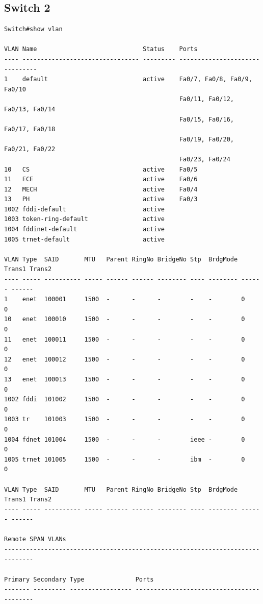 \documentclass[11pt]{article}
\begin{document}
\subsection{Switch 2}

\begin{lstlisting}
Switch#show vlan

VLAN Name                             Status    Ports
---- -------------------------------- --------- -------------------------------
1    default                          active    Fa0/7, Fa0/8, Fa0/9, Fa0/10
                                                Fa0/11, Fa0/12, Fa0/13, Fa0/14
                                                Fa0/15, Fa0/16, Fa0/17, Fa0/18
                                                Fa0/19, Fa0/20, Fa0/21, Fa0/22
                                                Fa0/23, Fa0/24
10   CS                               active    Fa0/5
11   ECE                              active    Fa0/6
12   MECH                             active    Fa0/4
13   PH                               active    Fa0/3
1002 fddi-default                     active    
1003 token-ring-default               active    
1004 fddinet-default                  active    
1005 trnet-default                    active    

VLAN Type  SAID       MTU   Parent RingNo BridgeNo Stp  BrdgMode Trans1 Trans2
---- ----- ---------- ----- ------ ------ -------- ---- -------- ------ ------
1    enet  100001     1500  -      -      -        -    -        0      0
10   enet  100010     1500  -      -      -        -    -        0      0
11   enet  100011     1500  -      -      -        -    -        0      0
12   enet  100012     1500  -      -      -        -    -        0      0
13   enet  100013     1500  -      -      -        -    -        0      0
1002 fddi  101002     1500  -      -      -        -    -        0      0   
1003 tr    101003     1500  -      -      -        -    -        0      0   
1004 fdnet 101004     1500  -      -      -        ieee -        0      0   
1005 trnet 101005     1500  -      -      -        ibm  -        0      0   

VLAN Type  SAID       MTU   Parent RingNo BridgeNo Stp  BrdgMode Trans1 Trans2
---- ----- ---------- ----- ------ ------ -------- ---- -------- ------ ------

Remote SPAN VLANs
------------------------------------------------------------------------------

Primary Secondary Type              Ports
------- --------- ----------------- ------------------------------------------
\end{lstlisting}
\end{document}

